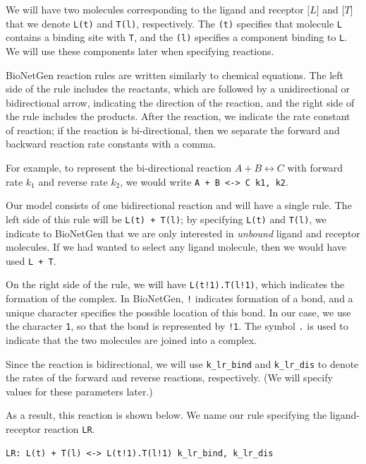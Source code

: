We will have two molecules corresponding to the ligand and receptor $\text{[}L\text{]}$ and $\text{[}T\text{]}$ that we denote \texttt{L(t)} and \texttt{T(l)}, respectively. The \texttt{(t)} specifies that molecule \texttt{L} contains a binding site with \texttt{T}, and the \texttt{(l)} specifies a component binding to \texttt{L}. We will use these components later when specifying reactions.

BioNetGen reaction rules are written similarly to chemical equations. The left side of the rule includes the reactants, which are followed by a unidirectional or bidirectional arrow, indicating the direction of the reaction, and the right side of the rule includes the products. After the reaction, we indicate the rate constant of reaction; if the reaction is bi-directional, then we separate the forward and backward reaction rate constants with a comma.

For example, to represent the bi-directional reaction $A + B \leftrightarrow C$ with forward rate $k_1$ and reverse rate $k_2$, we would write \texttt{A + B <-> C k1, k2}.

Our model consists of one bidirectional reaction and will have a single rule. The left side of this rule will be \texttt{L(t) + T(l)}; by specifying \texttt{L(t)} and \texttt{T(l)}, we indicate to BioNetGen that we are only interested in \textit{unbound} ligand and receptor molecules. If we had wanted to select any ligand molecule, then we would have used \texttt{L + T}.

On the right side of the rule, we will have \texttt{L(t!1).T(l!1)}, which indicates the formation of the complex. In BioNetGen, \texttt{!} indicates formation of a bond, and a unique character specifies the possible location of this bond. In our case, we use the character \texttt{1}, so that the bond is represented by \texttt{!1}. The symbol \texttt{.} is used to indicate that the two molecules are joined into a complex.

Since the reaction is bidirectional, we will use \texttt{k\_lr\_bind} and \texttt{k\_lr\_dis} to denote the rates of the forward and reverse reactions, respectively. (We will specify values for these parameters later.)

As a result, this reaction is shown below. We name our rule specifying the ligand-receptor reaction \texttt{LR}.


\begin{verbatim}
LR: L(t) + T(l) <-> L(t!1).T(l!1) k_lr_bind, k_lr_dis
\end{verbatim}

